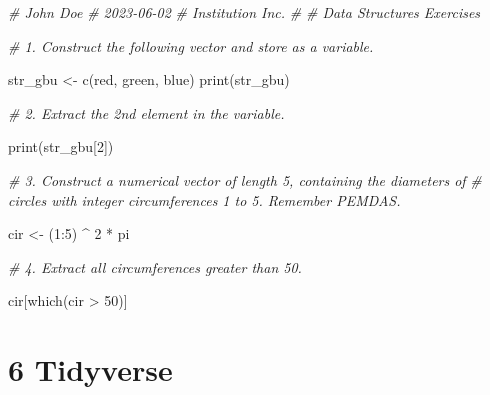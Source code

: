 \documentclass[
]{book}
\newenvironment{Shaded}{\begin{snugshade}}{\end{snugshade}}
\newcommand{\CommentTok}[1]{\textcolor[rgb]{0.56,0.35,0.01}{\textit{#1}}}
\newcommand{\DecValTok}[1]{\textcolor[rgb]{0.00,0.00,0.81}{#1}}
\newcommand{\FunctionTok}[1]{\textcolor[rgb]{0.00,0.00,0.00}{#1}}
\newcommand{\NormalTok}[1]{#1}
\newcommand{\OtherTok}[1]{\textcolor[rgb]{0.56,0.35,0.01}{#1}}
\newcommand{\SpecialCharTok}[1]{\textcolor[rgb]{0.00,0.00,0.00}{#1}}
\newcommand{\StringTok}[1]{\textcolor[rgb]{0.31,0.60,0.02}{#1}}
\begin{document}
\begin{Shaded}
\begin{Highlighting}[]
\CommentTok{\# John Doe}
\CommentTok{\# 2023{-}06{-}02}
\CommentTok{\# Institution Inc.}
\CommentTok{\#}
\CommentTok{\# Data Structures Exercises}

\CommentTok{\# 1.  Construct the following vector and store as a variable.}

\NormalTok{str\_gbu }\OtherTok{\textless{}{-}} \FunctionTok{c}\NormalTok{(}\StringTok{\textquotesingle{}red\textquotesingle{}}\NormalTok{, }\StringTok{\textquotesingle{}green\textquotesingle{}}\NormalTok{, }\StringTok{\textquotesingle{}blue\textquotesingle{}}\NormalTok{)}
\FunctionTok{print}\NormalTok{(str\_gbu)}


\CommentTok{\# 2.  Extract the 2nd element in the variable.}

\FunctionTok{print}\NormalTok{(str\_gbu[}\DecValTok{2}\NormalTok{])}


\CommentTok{\# 3.  Construct a numerical vector of length 5, containing the diameters of }
\CommentTok{\#     circles with integer circumferences 1 to 5. Remember PEMDAS.}

\NormalTok{cir }\OtherTok{\textless{}{-}}\NormalTok{ (}\DecValTok{1}\SpecialCharTok{:}\DecValTok{5}\NormalTok{) }\SpecialCharTok{\^{}} \DecValTok{2} \SpecialCharTok{*}\NormalTok{ pi}


\CommentTok{\# 4.  Extract all circumferences greater than 50.}

\NormalTok{cir[}\FunctionTok{which}\NormalTok{(cir }\SpecialCharTok{\textgreater{}} \DecValTok{50}\NormalTok{)]}
\end{Highlighting}
\end{Shaded}

\hypertarget{tidyverse-2}{%
\section*{\texorpdfstring{\textbf{6} Tidyverse}{6 Tidyverse}}\label{tidyverse-2}}
\end{document}
